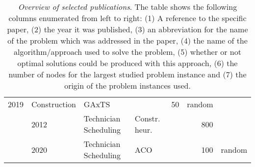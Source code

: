 \begin{table}[t]
\begin{tabular*}{\textwidth}{@{\extracolsep{\fill}}lllllrl}
			2019 & 
			Construction & 
			GAxTS & 
			 & 
			50 & 
			random \\
		\cite{firatImprovedMIPbasedApproach2012} & 
			2012 & 
			Technician Scheduling & 
			Constr. heur. & 
			 & 
			800 & 
			\cite{dutotTechniciansInterventionsScheduling2006} \\
		\cite{pereiraMultiperiodWorkforceScheduling2020} & 
			2020 & 
			Technician Scheduling & 
			ACO & 
			 & 
			100 & 
			random \\
		\bottomrule
	\end{tabular*} 
	\caption[Overview of selected publications]{%
		\label{tab:initial-compare}%
		\textit{Overview of selected publications}. The table shows the following columns enumerated from left to right: (1) A reference to the specific paper, (2) the year it was published, (3) an abbreviation for the name of the problem which was addressed in the paper, (4) the name of the algorithm/approach used to solve the problem, (5) whether or not optimal solutions could be produced with this approach, (6) the number of nodes for the largest studied problem instance and (7) the origin of the problem instances used.%
\footnoterule
%
\\ %
%
%
}
\end{table}
